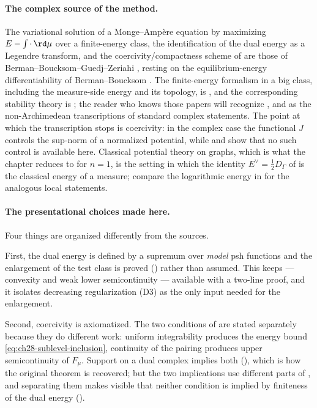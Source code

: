 \paragraph{The complex source of the method.}
The variational solution of a Monge--Amp\`ere equation by maximizing
\(E-\int\cdot\,\rd\mu\) over a finite-energy class, the identification of the
dual energy as a Legendre transform, and the coercivity/compactness scheme of
 are those of Berman--Boucksom--Guedj--Zeriahi
\cite{BBGZ13}, resting on the equilibrium-energy differentiability of
Berman--Boucksom \cite{BB10}.  The finite-energy formalism in a big class,
including the measure-side energy and its topology, is \cite{BEGZ10}, and the
corresponding stability theory is \cite{BBEGZ16}; the reader who knows those
papers will recognize ,
 and  as
the non-Archimedean transcriptions of standard complex statements.  The point
at which the transcription stops is coercivity: in the complex case the
functional \(J\) controls the sup-norm of a normalized potential, while
 and
 show that no such control is available
here.  Classical potential theory on graphs, which is what the chapter
reduces to for \(n=1\), is the setting in which the identity
\(E^\vee=\tfrac12D_\Gamma\) of  is the
classical energy of a measure; compare the logarithmic energy in
\cite{Ceg98,Ceg04} for the analogous local statements.

\paragraph{The presentational choices made here.}
Four things are organized differently from the sources.

First, the dual energy is defined by a supremum over \emph{model} psh
functions and the enlargement of the test class is proved
() rather than assumed.  This keeps
 --- convexity and weak lower
semicontinuity --- available with a two-line proof, and it isolates
decreasing regularization \textup{(D3)} as the only input needed for the
enlargement.

Second, coercivity is axiomatized.  The two conditions of
 are stated separately because they do
different work: uniform integrability produces the energy bound
\eqref{eq:ch28-sublevel-inclusion}, continuity of the pairing produces upper
semicontinuity of \(F_\mu\).  Support on a dual complex implies both
(), which is how the original theorem is
recovered; but the two implications use different parts of
, and separating them makes visible
that neither condition is implied by finiteness of the dual energy
().


